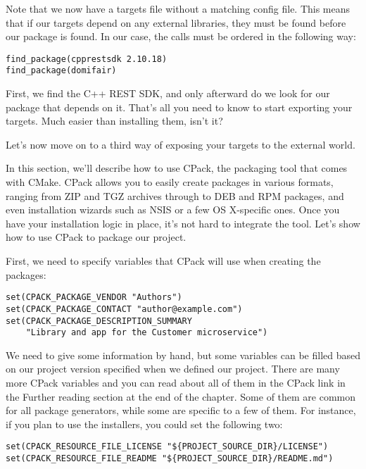 Note that we now have a targets file without a matching config file. This means that if our targets depend on any external libraries, they must be found before our package is found. In our case, the calls must be ordered in the following way:

\begin{lstlisting}[style=styleCMake]
find_package(cpprestsdk 2.10.18)
find_package(domifair)
\end{lstlisting}

First, we find the C++ REST SDK, and only afterward do we look for our package that depends on it. That's all you need to know to start exporting your targets. Much easier than installing them, isn't it?

Let's now move on to a third way of exposing your targets to the external world.


In this section, we'll describe how to use CPack, the packaging tool that comes with CMake. CPack allows you to easily create packages in various formats, ranging from ZIP and TGZ archives through to DEB and RPM packages, and even installation wizards such as NSIS or a few OS X-specific ones. Once you have your installation logic in place, it's not hard to integrate the tool. Let's show how to use CPack to package our project.

First, we need to specify variables that CPack will use when creating the packages:

\begin{lstlisting}[style=styleCMake]
set(CPACK_PACKAGE_VENDOR "Authors")
set(CPACK_PACKAGE_CONTACT "author@example.com")
set(CPACK_PACKAGE_DESCRIPTION_SUMMARY
	"Library and app for the Customer microservice")
\end{lstlisting}

We need to give some information by hand, but some variables can be filled based on our project version specified when we defined our project. There are many more CPack variables and you can read about all of them in the CPack link in the Further reading section at the end of the chapter. Some of them are common for all package generators, while some are specific to a few of them. For instance, if you plan to use the installers, you could set the following two:

\begin{lstlisting}[style=styleCMake]
set(CPACK_RESOURCE_FILE_LICENSE "${PROJECT_SOURCE_DIR}/LICENSE")
set(CPACK_RESOURCE_FILE_README "${PROJECT_SOURCE_DIR}/README.md")
\end{lstlisting}

